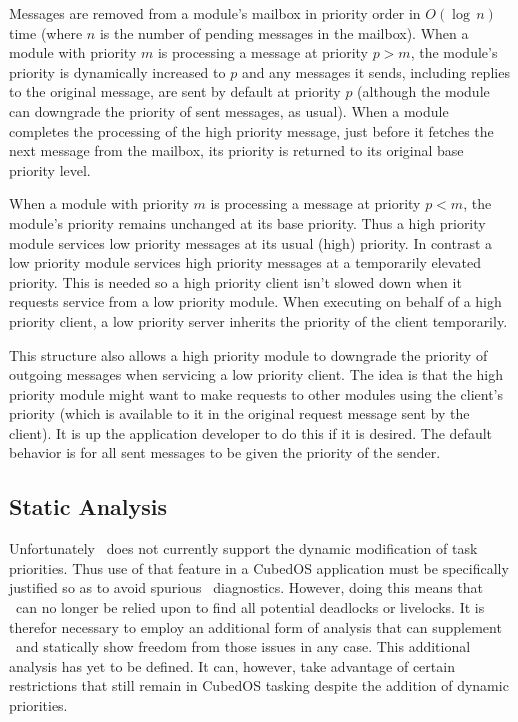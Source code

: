 Messages are removed from a module's mailbox in priority order in $O(\log\,n)$ time (where $n$
is the number of pending messages in the mailbox).  When a module with priority $m$ is processing a message at priority $p > m$, the
module's priority is dynamically increased to $p$ and any messages it sends, including replies
to the original message, are sent by default at priority $p$ (although the module can downgrade
the priority of sent messages, as usual). When a module completes the processing of the high
priority message, just before it fetches the next message from the mailbox, its priority is
returned to its original base priority level.

When a module with priority $m$ is processing a message at priority $p < m$, the module's
priority remains unchanged at its base priority. Thus a high priority module services low
priority messages at its usual (high) priority. In contrast a low priority module services high
priority messages at a temporarily elevated priority. This  is
needed so a high priority client isn't slowed down when it requests service from a low priority
module. When executing on behalf of a high priority client, a low priority server inherits the
priority of the client temporarily.

This structure also allows a high priority module to downgrade the priority of outgoing messages
when servicing a low priority client. The idea is that the high priority module might want to
make requests to other modules using the client's priority (which is available to it in the
original request message sent by the client). It is up the application developer to do this if
it is desired. The default behavior is for all sent messages to be given the priority of the
sender.

\subsection{Static Analysis}

Unfortunately \SPARK\ does not currently support the dynamic modification of task priorities.
Thus use of that feature in a CubedOS application must be specifically justified so as to avoid
spurious \SPARK\ diagnostics. However, doing this means that \SPARK\ can no longer be relied
upon to find all potential deadlocks or livelocks. It is therefor necessary to employ an
additional form of analysis that can supplement \SPARK\ and statically show freedom from those
issues in any case. This additional analysis has yet to be defined. It can, however, take
advantage of certain restrictions that still remain in CubedOS tasking despite the addition of
dynamic priorities.

